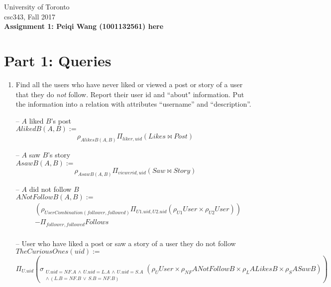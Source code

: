 \documentclass{article}
\newcommand{\var}[1]{\mathit{#1}}
\begin{document}
\noindent
University of Toronto\\
{\sc csc}343, Fall 2017\\[10pt]
{\LARGE\bf Assignment 1: Peiqi Wang (1001132561) here} \\[10pt]


\section*{Part 1: Queries}

\begin{enumerate}

\item   %
Find all the users who have never liked or viewed a post or story 
of a user that they do {\it not} follow. 
Report their user id and ``about" information. 
Put the information into a relation with attributes ``username'' and ``description''. \\

{\large %

-- $A$ liked $B$'s post \\ 
$\var{AlikedB}(A,B) := $
\[
    \rho_{\var{AlikesB}(A,B)}
    \Pi_{liker, uid} 
    (\var{Likes} \bowtie \var{Post})
\]

-- $A$ saw $B$'s story \\ 
$\var{AsawB}(A,B) := $
\[
    \rho_{\var{AsawB}(A,B)}
    \Pi_{viewerid, uid} 
    (\var{Saw} \bowtie \var{Story})
\]

-- $A$ did not follow $B$ \\ 
$\var{ANotFollowB}(A,B) :=$
\begin{align*}
    &\left(\rho_{\var{UserCombination}(follower,followed)} \Pi_{U1.uid, U2.uid}( \rho_{U1}\var{User}\times\rho_{U2} \var{User})\right)  \\ 
    &- \Pi_{follower, followed} \var{Follows}\\ 
\end{align*}

-- User who have liked a post or saw a story of a user they do not follow \\ 
$\var{TheCuriousOnes}(uid) :=$
\[
    \Pi_{U.uid}
    \left( 
        \sigma_{\substack{
            U.uid=NF.A \,\land\, U.uid=L.A \,\land\, U.uid=S.A \\
            \land\, (L.B=NF.B \,\lor\, S.B=NF.B)
        }} (\rho_{U}\var{User} \times \rho_{NF} \var{ANotFollowB} \times \rho_{L} \var{ALikesB} \times \rho_{S} \var{ASawB})
    \right)
\]

}
\end{enumerate}
\end{document}
